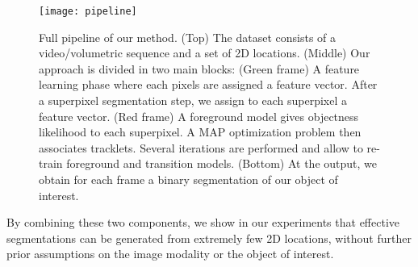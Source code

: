 \begin{figure}[!ht]
  \centering
    \texttt{[image: pipeline]}
\caption{Full pipeline of our method.
  (Top) The dataset consists of a video/volumetric sequence and a set of 2D locations. (Middle) Our approach is divided in two main blocks: (Green frame) A feature learning phase where each pixels are assigned a feature vector. After a superpixel segmentation step, we assign to each superpixel a feature vector. (Red frame) A foreground model gives objectness likelihood to each superpixel. A MAP optimization problem then associates tracklets. Several iterations are performed and allow to re-train foreground and transition models. (Bottom) At the output, we obtain for each frame a binary segmentation of our object of interest.}
\label{fig:pipeline}
\end{figure}

By combining these two components, we show in our experiments that effective segmentations can be generated from extremely few 2D locations, without further prior assumptions on the image modality or the object of interest. 

